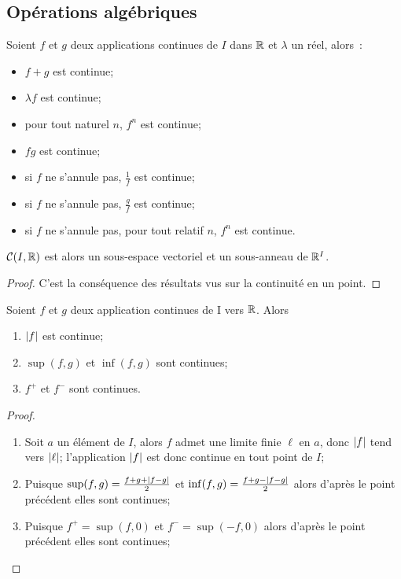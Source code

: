 \subsection{Opérations algébriques}

\begin{prop}
  Soient \(f\) et \(g\) deux applications continues de \(I\) dans \(\mathbb{R}\) et 
  \(\lambda\) un réel, alors~:
  \begin{itemize}
    \item \(f+g\) est continue;
    \item \(\lambda f\) est continue;
    \item pour tout naturel \(n\), \(f^n\) est continue;
    \item \(fg\) est continue;
    \item si \(f\) ne s'annule pas, \(\frac{1}{f}\) est continue;
    \item si \(f\) ne s'annule pas, \(\frac{g}{f}\) est continue;
    \item si \(f\) ne s'annule pas, pour tout relatif \(n\), \(f^n\) est 
      continue.
  \end{itemize}
  \(\mathcal{C}(I,\mathbb{R})\) est alors un sous-espace vectoriel et un sous-anneau de 
  \(\mathbb{R}^I\).
\end{prop}
\begin{proof}
  C'est la conséquence des résultats vus sur la continuité en un point.
\end{proof}
\begin{prop}
  Soient \(f\) et \(g\) deux application continues de I vers \(\mathbb{R}\). Alors
  \begin{enumerate}
    \item \(\left\lvert f\right\rvert\) est continue;
    \item \(\sup(f,g)\) et \(\inf(f,g)\) sont continues;
    \item \(f^{+}\) et \(f^{-}\) sont continues.
  \end{enumerate}
\end{prop}
\begin{proof}
  \begin{enumerate}
    \item Soit \(a\) un élément de \(I\), alors \(f\) admet une limite finie 
      \(\ell\) en \(a\), donc \(\left\lvert f\right\rvert\) tend vers \(\left\lvert\ell\right\rvert\); 
      l'application \(\left\lvert f\right\rvert\) est donc continue en tout point de \(I\);
    \item Puisque \(\sup(f,g)=\frac{f+g+\left\lvert f-g\right\rvert}{2}\) et 
      \(\inf(f,g)=\frac{f+g-\left\lvert f-g\right\rvert}{2}\) alors d'après le point précédent 
      elles sont continues;
    \item Puisque \(f^{+}=\sup(f,0)\) et \(f^{-}=\sup(-f,0)\) alors d'après le 
      point précédent elles sont continues;
  \end{enumerate}
\end{proof}
